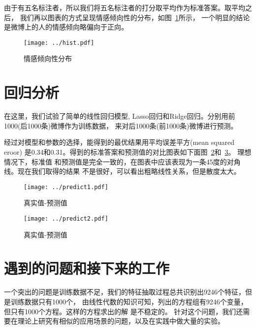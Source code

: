 \documentclass[12pt]{article}
\begin{document}
由于有五名标注者，所以我们将五名标注者的打分取平均作为标准答案。取平均之后，
我们再以图表的方式呈现情感倾向性的分布，如图~\ref{fig:hist}所示，
一个明显的结论是微博上的人的情感倾向略偏向于正向。

\begin{figure}
  \centering
  \texttt{[image: ../hist.pdf]}
  \caption{情感倾向性分布}
  \label{fig:hist}
\end{figure}

\section{回归分析}
在这里，我们试验了简单的线性回归模型, Lasso回归和Ridge回归。分别用前1000(后1000条)微博作为训练数据，
来对后1000条(前1000条)微博进行预测。

经过对模型和参数的选择，能得到的最优结果用平均误差平方(mean squared eroor)
是0.34和0.31。得到的标准答案和预测值的对比图表如下面图~\ref{fig:predicted1}和~\ref{fig:predicted2}。
理想情况下，标准值
和预测值是完全一致的，在图表中应该表现为一条45度的对角线。现在我们取得的结果
不是很好，可以看出粗略线性关系，但是散度太大。
\begin{figure}
  \centering
  \texttt{[image: ../predict1.pdf]}
  \caption{真实值-预测值}
  \label{fig:predicted1}
\end{figure}

\begin{figure}
  \centering
  \texttt{[image: ../predict2.pdf]}
  \caption{真实值-预测值}
  \label{fig:predicted2}
\end{figure}

\section{遇到的问题和接下来的工作}
一个突出的问题是训练数据不足，我们的特征抽取过程总共识别出9246个特征，但是训练数据只有1000个，
由线性代数的知识可知，列出的方程组有9246个变量，但只有1000个方程。这样的方程求出的解
是不稳定的。
针对这个问题，我们还需要在理论上研究有相似的应用场景的问题，以及在实践中做大量的实验。
%
%
\end{document}
